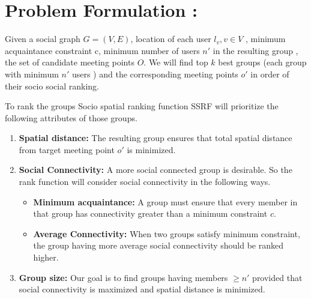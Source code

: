 \documentclass{vldb}
\begin{document}
		\section{Problem Formulation :} Given a social graph $ G = (V, E) $, location of each user $ l_v , v \in V$ , minimum acquaintance constraint c, minimum number of users $ n' $ in the resulting group , the set of candidate meeting
		points $ O $. We will find top $ k $ best groups (each group with minimum $ n' $ users ) and the
		corresponding meeting points $ o' $ in order of their socio social ranking.
		
		
		
		To rank the groups Socio spatial ranking function SSRF will prioritize the following attributes of those groups.
		
		\begin{enumerate}
		\item \textbf{Spatial distance:} The resulting group ensures that total spatial distance from target meeting point $ o' $ is minimized.
		\item \textbf{Social Connectivity:} A more social connected group is desirable. So the rank function will consider social connectivity in the following ways.
			\begin{itemize}
			\item \textbf{Minimum acquaintance:}  A group must ensure that every member in that group has connectivity greater than a minimum constraint $ c $.
			\item \textbf{Average Connectivity:} When two groups satisfy minimum constraint, the group having more average social connectivity should be ranked higher.	
			\end{itemize}
		\item \textbf{Group size:} Our  goal is to find groups having  members $ \geq n' $ provided that social connectivity is maximized and spatial distance is minimized. 
		\end{enumerate}
		
\end{document}
